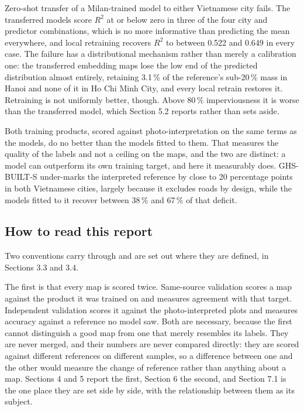 \documentclass[11pt,a4paper]{article}
\newcommand{\Rsq}{$R^2$}
\begin{document}
Zero-shot transfer of a Milan-trained model to either Vietnamese city fails. The
transferred models score \Rsq{} at or below zero in three of the four city and
predictor combinations, which is no more informative than predicting the mean
everywhere, and local retraining recovers \Rsq{} to between 0.522 and 0.649 in every
case. The failure has a distributional mechanism rather than merely a
calibration one: the transferred embedding maps lose the low end of the
predicted distribution almost entirely, retaining 3.1\,\% of the reference's
sub-20\,\% mass in Hanoi and none of it in Ho Chi Minh City, and every local
retrain restores it. Retraining is not uniformly better, though. Above 80\,\%
imperviousness it is worse than the transferred model, which Section 5.2 reports
rather than sets aside.

Both training products, scored against photo-interpretation on the same terms as
the models, do no better than the models fitted to them. That measures the
quality of the labels and not a ceiling on the maps, and the two are distinct: a
model can outperform its own training target, and here it measurably does.
GHS-BUILT-S under-marks the interpreted reference by close to 20 percentage
points in both Vietnamese cities, largely because it excludes roads by design,
while the models fitted to it recover between 38\,\% and 67\,\% of that deficit.

\subsection*{How to read this report}

Two conventions carry through and are set out where they are defined, in
Sections 3.3 and 3.4.

The first is that every map is scored twice. Same-source validation scores a map
against the product it was trained on and measures agreement with that target.
Independent validation scores it against the photo-interpreted plots and
measures accuracy against a reference no model saw. Both are necessary, because
the first cannot distinguish a good map from one that merely resembles its
labels. They are never merged, and their numbers are never compared directly:
they are scored against different references on different samples, so a
difference between one and the other would measure the change of reference
rather than anything about a map. Sections 4 and 5 report the first, Section 6
the second, and Section 7.1 is the one place they are set side by side, with the
relationship between them as its subject.
\end{document}
